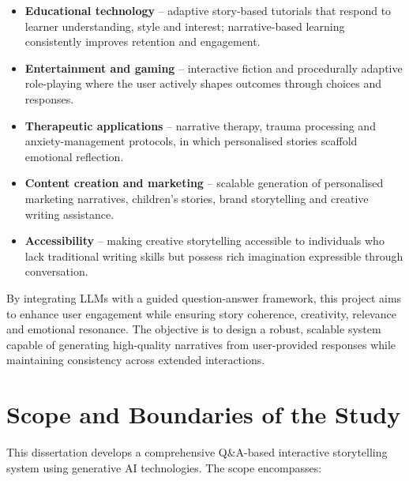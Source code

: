 \begin{itemize}
    \item \textbf{Educational technology} -- adaptive story-based
    tutorials that respond to learner understanding, style and
    interest; narrative-based learning consistently improves
    retention and engagement.
    \item \textbf{Entertainment and gaming} -- interactive fiction
    and procedurally adaptive role-playing where the user actively
    shapes outcomes through choices and responses.
    \item \textbf{Therapeutic applications} -- narrative therapy,
    trauma processing and anxiety-management protocols, in which
    personalised stories scaffold emotional reflection.
    \item \textbf{Content creation and marketing} -- scalable
    generation of personalised marketing narratives, children's
    stories, brand storytelling and creative writing assistance.
    \item \textbf{Accessibility} -- making creative storytelling
    accessible to individuals who lack traditional writing skills
    but possess rich imagination expressible through conversation.
\end{itemize}

By integrating LLMs with a guided question-answer framework, this
project aims to enhance user engagement while ensuring story
coherence, creativity, relevance and emotional resonance. The
objective is to design a robust, scalable system capable of
generating high-quality narratives from user-provided responses while
maintaining consistency across extended interactions.

\section{Scope and Boundaries of the Study}
This dissertation develops a comprehensive Q\&A-based interactive
storytelling system using generative AI technologies. The scope
encompasses:

